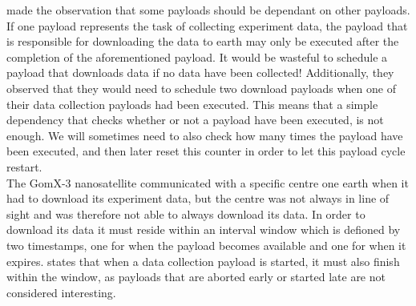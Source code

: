 \cite{gomx3} made the observation that some payloads should be dependant on other payloads. If one payload represents the task of collecting experiment data, the payload that is responsible for downloading the data to earth may only be executed after the completion of the aforementioned payload. It would be wasteful to schedule a payload that downloads data if no data have been collected! Additionally, they observed that they would need to schedule two download payloads when one of their data collection payloads had been executed. This means that a simple dependency that checks whether or not a payload have been executed, is not enough. We will sometimes need to also check how many times the payload have been executed, and then later reset this counter in order to let this payload cycle restart.\\
The GomX-3 nanosatellite communicated with a specific centre one earth when it had to download its experiment data, but the centre was not always in line of sight and was therefore not able to always download its data. In order to download its data it must reside within an interval window which is defioned by two timestamps, one for when the payload becomes available and one for when it expires. \cite{gomx3} states that when a data collection payload is started, it must also finish within the window, as payloads that are aborted early or started late are not considered interesting.